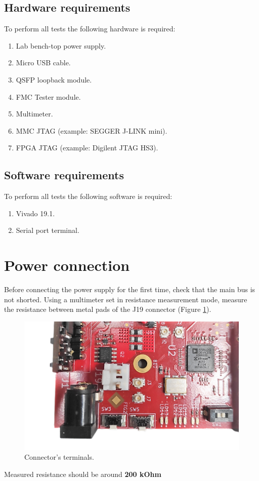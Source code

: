 \documentclass[12pt,oneside,a4]{article}
\begin{document}
\subsection{Hardware requirements}
To perform all tests the following hardware is required:
\begin{enumerate}
    \item Lab bench-top power supply.
    \item Micro USB cable.
    \item QSFP loopback module.
    \item FMC Tester module.
    \item Multimeter.
    \item MMC JTAG (example: SEGGER J-LINK mini).
    \item FPGA JTAG (example: Digilent JTAG HS3).
\end{enumerate}

\subsection{Software requirements}
To perform all tests the following software is required:
\begin{enumerate}
    \item Vivado 19.1.
    \item Serial port terminal.
\end{enumerate}

\section{Power connection}
Before connecting the power supply for the first time, check that the main bus is not shorted. Using a multimeter set in resistance measurement mode, measure the resistance between metal pads of the J19 connector (Figure \ref{01}).
\begin{figure}[H]
\begin{center}
\includegraphics[width=0.9\linewidth]{J19.png}
 \caption{Connector's terminals. }\label{01}
\end{center}
\end{figure}
\begin{leftbar}
Measured resistance should be around \textbf{{\color{red}200 kOhm}}
\end{leftbar}
\end{document}

